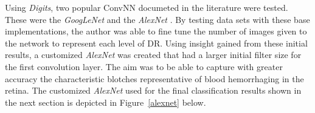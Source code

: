 \documentclass[letterpaper,12pt]{article}
\newcommand{\figref}[1]{Figure~\ref{#1}}
\begin{document}
Using \textit{Digits}, two popular ConvNN documeted in the literature were tested. These were the \textit{GoogLeNet} \cite{GoogLeNet} and the \textit{AlexNet} \cite{AlexNet}. By testing data sets with these base implementations, the author was able to fine tune the number of images given to the network to represent each level of DR. Using insight gained from these initial results, a customized \textit{AlexNet} was created that had a larger initial filter size for the first convolution layer. The aim was to be able to capture with greater accuracy the characteristic blotches representative of blood hemorrhaging in the retina. The customized \textit{AlexNet} used for the final classification results shown in the next section is depicted in \figref{alexnet} below.

\begin{figure}[htbp]
\begin{center}

\end{center}
\end{figure}
\end{document}
